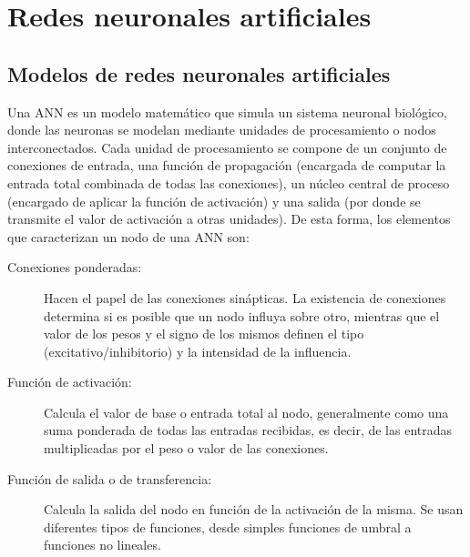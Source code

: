  \chapter{Redes neuronales artificiales}\label{redesneuronales}
\section{Modelos de redes neuronales artificiales}\label{modelos}
\noindent
Una  ANN \cite{Bishop1995,Haykin2008} es un  modelo matemático que simula un sistema
neuronal biológico, donde las neuronas se modelan mediante unidades
de  procesamiento  o  nodos interconectados.  Cada  unidad  de  procesamiento  se
compone de un conjunto de conexiones  de  entrada,  una  función  de  propagación
(encargada  de  computar  la entrada  total combinada de todas las conexiones), un núcleo
central de proceso (encargado de aplicar la función de activación) y una salida (por donde
se transmite el valor de activación a otras unidades). De esta forma, los elementos que
caracterizan un nodo de una
ANN son:
\begin{description}
	\item[Conexiones ponderadas:] Hacen  el  papel  de  las conexiones  sinápticas.  La
	existencia  de conexiones determina si es posible que un nodo influya sobre otro,
	mientras que el valor de los pesos y el signo de los mismos definen el tipo
	(excitativo/inhibitorio) y la intensidad de la influencia.
	\item[Función de activación:] Calcula el valor de base o entrada total al nodo,
	generalmente como una  suma  ponderada  de  todas  las  entradas  recibidas,  es
	decir,  de  las entradas multiplicadas por  el  peso  o  valor  de  las  conexiones.
	\item[Función de salida o de transferencia:] Calcula la salida del nodo en función de
	la activación de la misma. Se  usan diferentes	tipos  de  funciones,  desde  simples
	funciones de umbral a funciones no lineales.
 \end{description}

